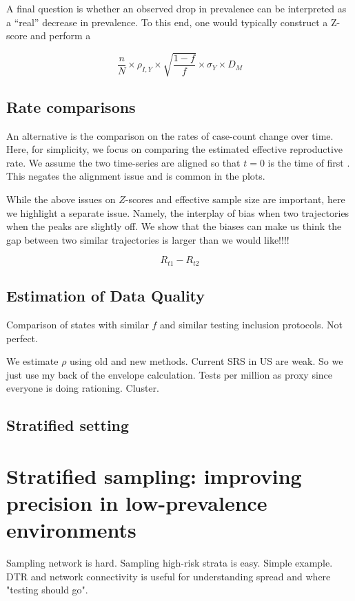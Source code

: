\documentclass[11pt]{amsart}
\begin{document}
A final question is whether an observed drop in prevalence can be interpreted as a ``real'' decrease in prevalence.  To this end, one would typically construct a Z-score and perform a


$$
\frac{n}{N} \times \rho_{I,Y} \times \sqrt{\frac{1-f}{f}} \times \sigma_{Y} \times D_M
$$

\subsection{Rate comparisons}

An alternative is the comparison on the rates of case-count change over time.  Here, for simplicity, we focus on comparing the estimated effective reproductive rate.  We assume the two time-series are aligned so that $t=0$ is the time of first .  This negates the alignment issue and is common in the plots.

While the above issues on $Z$-scores and effective sample size are important, here we highlight a separate issue.  Namely, the interplay of bias when two trajectories when the peaks are slightly off.  We show that the biases can make us think the gap between two similar trajectories is larger than we would like!!!!

$$
R_{t1} - R_{t2}
$$

\subsection{Estimation of Data Quality}

Comparison of states with similar $f$ and similar testing inclusion protocols.  Not perfect.

We estimate $\rho$ using old and new methods.  Current SRS in US are weak.  So we just use my back of the envelope calculation. Tests per million as proxy since everyone is doing rationing. Cluster.


\subsection{Stratified setting}


\section{Stratified sampling: improving precision in low-prevalence environments}

Sampling network is hard.  Sampling high-risk strata is easy.  Simple example.
DTR and network connectivity is useful for understanding spread and where "testing should go".
\end{document}

